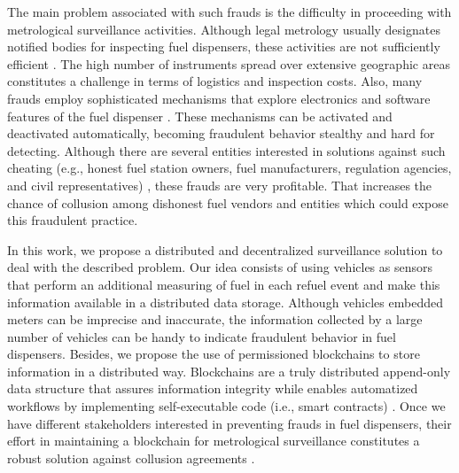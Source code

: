 \documentclass[sigplan]{acmart}
\begin{document}
The main problem associated with such frauds is the difficulty in proceeding with metrological surveillance activities.
Although legal metrology usually designates notified bodies for inspecting fuel dispensers, these activities are not sufficiently efficient \cite{MeloJr.2019}.
The high number of instruments spread over extensive geographic areas constitutes a challenge in terms of logistics and inspection costs.
Also, many frauds employ sophisticated mechanisms that explore electronics and software features of the fuel dispenser \cite{Leitao2014a}.
These mechanisms can be activated and deactivated automatically, becoming fraudulent behavior stealthy and hard for detecting.
Although there are several entities interested in solutions against such cheating (e.g., honest fuel station owners, fuel manufacturers, regulation agencies, and civil representatives) \cite{Beteto2016,Oppermann2018}, these frauds are very profitable.
That increases the chance of collusion among dishonest fuel vendors and entities which could expose this fraudulent practice.

In this work, we propose a distributed and decentralized surveillance solution to deal with the described problem.
Our idea consists of using vehicles as sensors that perform an additional measuring of fuel in each refuel event and make this information available in a distributed data storage.
Although vehicles embedded meters can be imprecise and inaccurate, the information collected by a large number of vehicles can be handy to indicate fraudulent behavior in fuel dispensers.
Besides, we propose the use of permissioned blockchains \cite{Vukolic2016} to store information in a distributed way.
Blockchains are a truly distributed append-only data structure that assures information integrity while enables automatized workflows by implementing self-executable code (i.e., smart contracts) \cite{Christidis2016,Vukolic2017a}.
Once we have different stakeholders interested in preventing frauds in fuel dispensers, their effort in maintaining a blockchain for metrological surveillance constitutes a robust solution against collusion agreements \cite{MeloJr.2019}.
\end{document}

